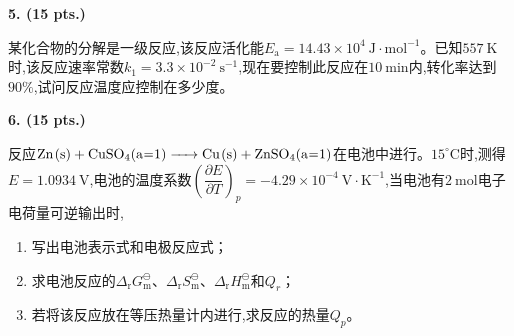 \vspace{0.5cm}
\noindent\textbf{5. (15 pts.)}

某化合物的分解是一级反应,该反应活化能$E_\mathrm{a} = 14.43\times10^4\ \mathrm{J\cdot mol^{-1}}$。已知$557\ \mathrm{K}$时,该反应速率常数$k_1 = 3.3\times10^{-2}\ \mathrm{s^{-1}}$,现在要控制此反应在$10\ \mathrm{min}$内,转化率达到$90\%$,试问反应温度应控制在多少度。

\vspace{0.5cm}
\noindent\textbf{6. (15 pts.)}

反应$\ce{Zn(s) + CuSO_{4}(a=1) -> Cu(s) + ZnSO_{4}(a=1)}$在电池中进行。$15^\circ\mathrm{C}$时,测得$E=1.0934\ \mathrm{V}$,电池的温度系数$\left(\dfrac{\partial E}{\partial T}\right)_p = -4.29\times10^{-4}\ \mathrm{V\cdot K^{-1}}$,当电池有$2\ \mathrm{mol}$电子电荷量可逆输出时,
\begin{enumerate}[label=(\arabic*), itemsep=1ex]
    \item 写出电池表示式和电极反应式；
    \item 求电池反应的$\Delta_\mathrm{r}G_\mathrm{m}^\ominus$、$\Delta_\mathrm{r}S_\mathrm{m}^\ominus$、$\Delta_\mathrm{r}H_\mathrm{m}^\ominus$和$Q_r$；
    \item 若将该反应放在等压热量计内进行,求反应的热量$Q_p$。
\end{enumerate}